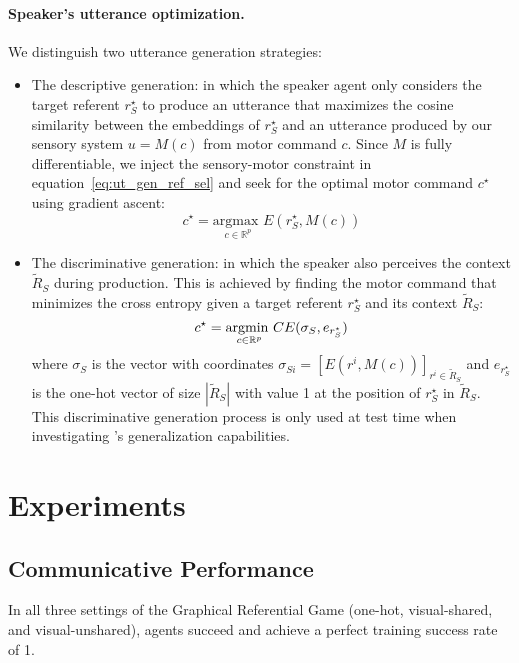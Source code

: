 \paragraph{Speaker's utterance optimization. } We distinguish two utterance generation strategies:
\begin{itemize}[noitemsep]
    \item The descriptive generation: in which the speaker agent only considers the target referent $r_S^\star$ to produce an utterance that maximizes the cosine similarity between the embeddings of $r_S^\star$ and an utterance produced by our sensory system $u = M(c)$ from motor command $c$. Since $M$ is fully differentiable, we inject the sensory-motor constraint in equation~\ref{eq:ut_gen_ref_sel} and seek for the optimal motor command $c^\star$ using gradient ascent:
\begin{equation}
c^\star = \underset{c \in \mathbb{R}^p}{\textrm{argmax }} E(r^\star_S, M(c))
\label{eq:descri_gen}
\end{equation}
    \item The discriminative generation: in which the speaker also perceives the context $\tilde{R}_S$ during production. This is achieved by finding the motor command that minimizes the cross entropy given a target referent $r^\star_S$ and its context $\tilde{R}_S$:
\begin{equation}
    c^\star = \underset{c\in \mathbb{R} ^p}{\textrm{argmin }} CE( \sigma_S, e_{r^\star_S})
    \label{eq:discri_gen}
\end{equation}
%
where $\sigma_S$ is the vector with coordinates $\sigma_{Si} = [E(r^i, M(c))]_{r^i\in \tilde{R}_S}$ and $e_{r^\star_S}$ is the one-hot vector of size $|\tilde{R}_S|$ with value 1 at the position of $r^\star_S$ in $\tilde{R}_S$. This discriminative generation process is only used at test time when investigating \curves's generalization capabilities. 
\end{itemize}

\section{Experiments}

\subsection{Communicative Performance}
\label{sec:results_perf}


 In all three settings of the Graphical Referential Game (one-hot, visual-shared, and visual-unshared), agents succeed and achieve a perfect training success rate of 1.



